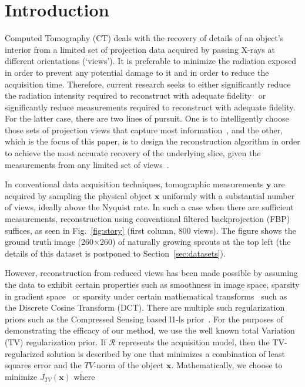 \documentclass[journal]{IEEEtran}
\begin{document}
\section{Introduction}
\label{sec:intro}
Computed Tomography (CT) deals with the recovery of details of an
object's interior from a limited set of projection data acquired by
passing X-rays at different orientations (`views'). It is preferable
to minimize the radiation exposed in order to prevent any potential
damage to it and in order to reduce the acquisition time. Therefore,
current research seeks to either significantly reduce the radiation
intensity required to reconstruct with adequate
fidelity~\cite{yang2018,Lin2016,Xie2017,gopal2019low} or significantly
reduce measurements required to reconstruct with
adequate fidelity. For the latter case, there are two lines of
pursuit. One is to intelligently choose those sets of projection views
that capture most
information~\cite{King2018,Anthony2018,barkan17,fischer16,andrei14},
and the other, which is the focus of this paper, is to design the
reconstruction algorithm in order to achieve the most accurate
recovery of the underlying slice, given the measurements from any
limited set of views~\cite{yang2018,geyer2015,kilic2011}.

In conventional data acquisition techniques, tomographic measurements
$\boldsymbol{y}$ are acquired by sampling the physical object
$\boldsymbol{x}$ uniformly with a substantial number of views, ideally
above the Nyquist rate. In such a case when there are sufficient
measurements, reconstruction using conventional filtered
backprojection (FBP) suffices, as seen in Fig.~\ref{fig:story} (first
column, 800 views). The figure shows the ground truth image
(260$\times$260) of naturally growing sprouts at the top left (the
details of this dataset is postponed to Section~\ref{sec:datasets}).

However, reconstruction from reduced views has been made possible by
assuming the data to exhibit certain properties such as smoothness in
image space, sparsity in gradient space~\cite{TV} or sparsity under
certain mathematical transforms~\cite{Donoho,introCS} such as the
Discrete Cosine Transform (DCT).  There are multiple such
regularization priors such as the Compressed
Sensing based l1-ls prior~\cite{my_dicta_paper}. For the purposes of
demonstrating the efficacy of our method, we use the well known total Variation (TV)
regularization prior.
If $\boldsymbol{\mathcal{R}}$ represents the acquisition
model, then the TV-regularized solution is described by one that
minimizes a combination of least squares error and the $TV$-norm of
the object $\boldsymbol{x}$. Mathematically, we choose to minimize
$J_{TV}(\boldsymbol{x})$ where
\end{document}

